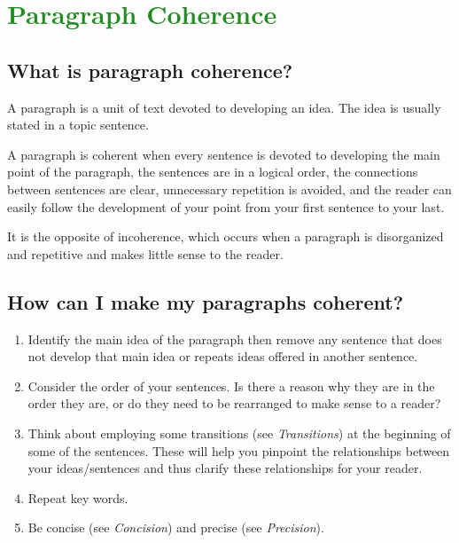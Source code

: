 

\section{\textcolor{ForestGreen}{Paragraph Coherence}}

\subsection{What is paragraph coherence?}

A paragraph is a unit of text devoted to developing an idea. The idea is usually stated in a topic sentence.

A paragraph is coherent when every sentence is devoted to developing the main point of the paragraph, the sentences are in a logical order, the connections between sentences are clear, unnecessary repetition is avoided, and the reader can easily follow the development of your point from your first sentence to your last.

It is the opposite of incoherence, which occurs when a paragraph is disorganized and repetitive and makes little sense to the reader.

\subsection{How can I make my paragraphs coherent?}

\begin{enumerate}

\item Identify the main idea of the paragraph then remove any sentence that does not develop that main idea or repeats ideas offered in another sentence.

\item Consider the order of your sentences. Is there a reason why they are in the order they are, or do they need to be rearranged to make sense to a reader?

\item Think about employing some transitions (see \emph{Transitions}) at the beginning of some of the sentences. These will help you pinpoint the relationships between your ideas/sentences and thus clarify these relationships for your reader.

\item Repeat key words.

\item Be concise (see \emph {Concision}) and precise (see \emph{Precision}).
\end{enumerate}
 
